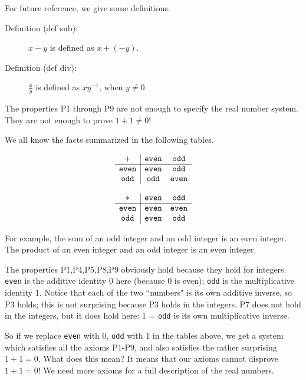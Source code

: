 \documentclass[12pt]{article}
\begin{document}
For future reference, we give some definitions.

\begin{description}

\item[Definition (def sub):]  $x-y$ is defined as $x+(-y)$.

\item[Definition (def div):]  $\frac xy$ is defined as $xy^{-1}$, when $y \neq 0$.

\end{description}

The properties P1 through P9 are not enough to specify the real number system.  They are not enough to prove $1+1 \neq 0$!

We all know the facts summarized in the following tables.

$$\begin{array} {c|cc}

+  & {\tt even} & {\tt odd} \\ \hline

{\tt even} &  {\tt even} & {\tt odd} \\

{\tt odd} & {\tt odd} & {\tt even} 

\end{array}$$

$$\begin{array} {c|cc}

*  & {\tt even} & {\tt odd} \\ \hline

{\tt even} &  {\tt even} & {\tt even} \\

{\tt odd} & {\tt even} & {\tt odd} 

\end{array}$$

For example, the sum of an odd integer and an odd integer is an even integer.  The product of an even integer and an odd integer is an even integer.

The properties P1,P4,P5,P8,P9 obviously hold because they hold for integers.  {\tt even} is the additive identity 0 here (because 0 is even);
{\tt odd} is the multiplicative identity 1.  Notice that each of the two ``numbers" is its own additive inverse, so P3 holds; this is not surprising
because P3 holds in the integers.  P7 does not hold in the integers, but it does hold here:  1 = {\tt odd} is its own multiplicative inverse.

So if we replace {\tt even} with 0, {\tt odd} with 1 in the tables above, we get a system which satisfies all the axioms P1-P9,
and also satisfies the rather surprising $1+1=0$.  What does this mean?  It means that our axioms cannot disprove $1+1=0$!  We need more axioms for a full description
of the real numbers.
\end{document}
